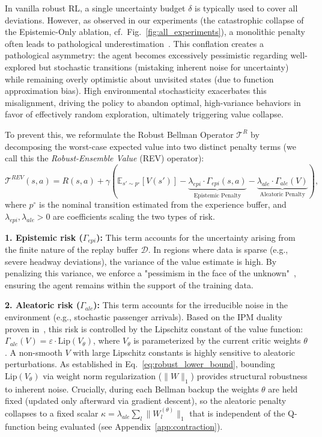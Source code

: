 \documentclass[10pt]{article}
\begin{document}
In vanilla robust RL, a single uncertainty budget $\delta$ is typically used to cover all deviations. However, as observed in our experiments (the catastrophic collapse of the Epistemic-Only ablation, cf.\ Fig.~\ref{fig:all_experiments}), a monolithic penalty often leads to pathological underestimation~\cite{Ji2024SeizingSerendipity}. This conflation creates a pathological asymmetry: the agent becomes excessively pessimistic regarding well-explored but stochastic transitions (mistaking inherent noise for uncertainty) while remaining overly optimistic about unvisited states (due to function approximation bias). High environmental stochasticity exacerbates this misalignment, driving the policy to abandon optimal, high-variance behaviors in favor of effectively random exploration, ultimately triggering value collapse.

To prevent this, we reformulate the Robust Bellman Operator $\mathcal{T}^R$ by decomposing the worst-case expected value into two distinct penalty terms (we call this the \textit{Robust-Ensemble Value} (REV) operator):
\begin{equation}
    \mathcal{T}^{REV}(s, a) = R(s, a) + \gamma \left( \mathbb{E}_{s' \sim p^\circ} [V(s')] - \underbrace{\lambda_{epi} \cdot \Gamma_{epi}(s, a)}_{\text{Epistemic Penalty}} - \underbrace{\lambda_{ale} \cdot \Gamma_{ale}(V)}_{\text{Aleatoric Penalty}} \right),
\end{equation}
where $p^\circ$ is the nominal transition estimated from the experience buffer, and $\lambda_{epi}, \lambda_{ale} > 0$ are coefficients scaling the two types of risk.

\textbf{1. Epistemic risk ($\Gamma_{epi}$):} This term accounts for the uncertainty arising from the finite nature of the replay buffer $\mathcal{D}$. In regions where data is sparse (e.g., severe headway deviations), the variance of the value estimate is high. By penalizing this variance, we enforce a "pessimism in the face of the unknown"~\cite{An2021UncertaintyEnsemble}, ensuring the agent remains within the support of the training data.

\textbf{2. Aleatoric risk ($\Gamma_{ale}$):} This term accounts for the irreducible noise in the environment (e.g., stochastic passenger arrivals). Based on the IPM duality proven in~\cite{Zhou2023NaturalActorCritic}, this risk is controlled by the Lipschitz constant of the value function: $\Gamma_{ale}(V) = \varepsilon \cdot \mathrm{Lip}(V_\theta)$, where $V_\theta$ is parameterized by the current critic weights $\theta$. A non-smooth $V$ with large Lipschitz constants is highly sensitive to aleatoric perturbations. As established in Eq.~\eqref{eq:robust_lower_bound}, bounding $\text{Lip}(V_\theta)$ via weight norm regularization ($\|W\|_1$) provides structural robustness to inherent noise. Crucially, during each Bellman backup the weights $\theta$ are held fixed (updated only afterward via gradient descent), so the aleatoric penalty collapses to a fixed scalar $\kappa = \lambda_{ale}\sum_l \|W_l^{(\theta)}\|_1$ that is independent of the Q-function being evaluated (see Appendix~\ref{app:contraction}).
\end{document}
